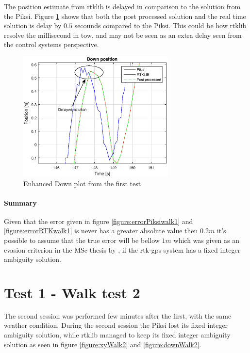 The position estimate from \gls{rtklib} is delayed in comparison to the solution from the Piksi. Figure \ref{figure:DownDelay} shows that both the post processed solution and the real time solution is delay by $0.5$ secounds compared to the Piksi. This could be how \gls{rtklib} resolve the millisecond in \acrfull{tow}, and may not be seen as an extra delay seen from the control systems perspective.
\begin{figure}[H]
	\centering
		\includegraphics[width=0.7\textwidth]{figs/plots/downDelay.eps}
		\caption{Enhanced Down plot from the first test}
		\label{figure:DownDelay}
\end{figure}
\paragraph{Summary}

Given that the error given in figure \ref{figure:errorPiksiwalk1} and \ref{figure:errorRTKwalk1} is never has a greater absolute value then $0.2m$ it's possible to assume that the true error will be bellow $1m$ which was given as an evasion criterion in the MSc thesis by \citep{Froelich}, if the \gls{rtk-gps} system has a fixed integer ambiguity solution.

\section{Test 1 - Walk test 2}
The second session was performed few minutes after the first, with the same weather condition.
During the second session the Piksi lost its fixed integer ambiguity solution, while \gls{rtklib} managed to keep its fixed integer ambiguity solution as seen in figure \ref{figure:xyWalk2} and \ref{figure:downWalk2}.

